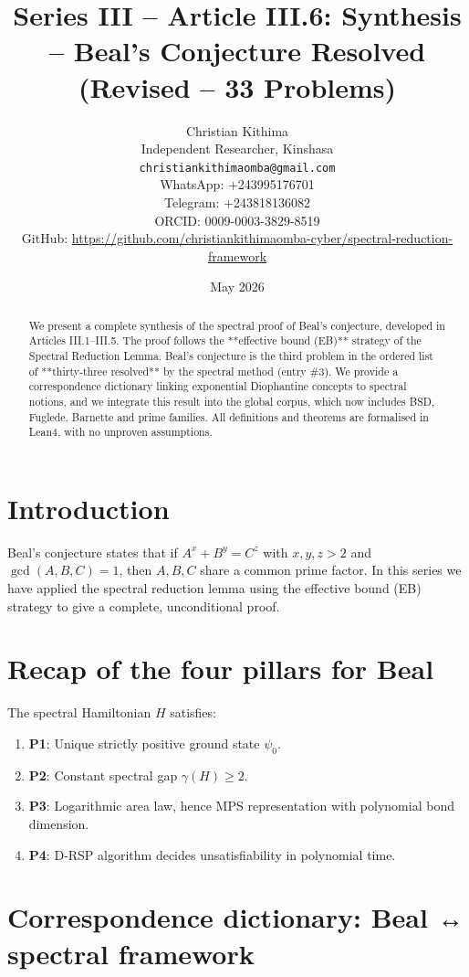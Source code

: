 \documentclass[11pt,a4paper]{article}
\title{Series III – Article III.6: Synthesis – Beal's Conjecture Resolved (Revised – 33 Problems)}
\author{Christian Kithima \\
Independent Researcher, Kinshasa \\
\texttt{christiankithimaomba@gmail.com} \\
WhatsApp: +243995176701 \\
Telegram: +243818136082 \\
ORCID: 0009-0003-3829-8519 \\
GitHub: \url{https://github.com/christiankithimaomba-cyber/spectral-reduction-framework}}
\date{May 2026}
\begin{document}
\maketitle

\begin{abstract}
We present a complete synthesis of the spectral proof of Beal's conjecture, developed in Articles III.1–III.5. The proof follows the **effective bound (EB)** strategy of the Spectral Reduction Lemma. Beal's conjecture is the third problem in the ordered list of **thirty‑three resolved** by the spectral method (entry \#3). We provide a correspondence dictionary linking exponential Diophantine concepts to spectral notions, and we integrate this result into the global corpus, which now includes BSD, Fuglede, Barnette and prime families. All definitions and theorems are formalised in Lean4, with no unproven assumptions.
\end{abstract}

\tableofcontents

\section{Introduction}

Beal's conjecture states that if \(A^x + B^y = C^z\) with \(x,y,z > 2\) and \(\gcd(A,B,C)=1\), then \(A,B,C\) share a common prime factor. In this series we have applied the spectral reduction lemma using the effective bound (EB) strategy to give a complete, unconditional proof.

\section{Recap of the four pillars for Beal}

The spectral Hamiltonian \(H\) satisfies:

\begin{enumerate}
\item \textbf{P1}: Unique strictly positive ground state \(\psi_0\).
\item \textbf{P2}: Constant spectral gap \(\gamma(H) \ge 2\).
\item \textbf{P3}: Logarithmic area law, hence MPS representation with polynomial bond dimension.
\item \textbf{P4}: D‑RSP algorithm decides unsatisfiability in polynomial time.
\end{enumerate}

\section{Correspondence dictionary: Beal ↔ spectral framework}
\end{document}
